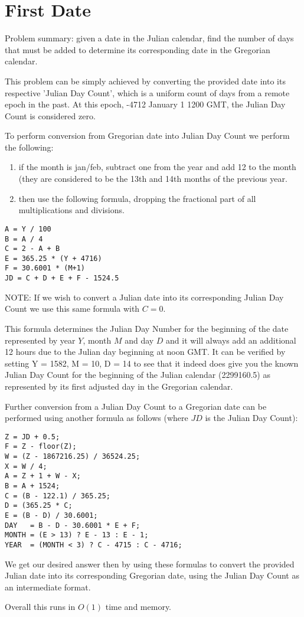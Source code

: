 \section{First Date}

Problem summary: given a date in the Julian calendar, find the number of days that must
be added to determine its corresponding date in the Gregorian calendar.

This problem can be simply achieved by converting the provided date into its respective
'Julian Day Count', which is a uniform count of days from a remote epoch in the past.
At this epoch, -4712 January 1 1200 GMT, the Julian Day Count is considered zero.

To perform conversion from Gregorian date into Julian Day Count we perform the following:

\begin{enumerate}
\item if the month is jan/feb, subtract one from the year and add 12 to the month (they are 
considered to be the 13th and 14th months of the previous year. \\
\item then use the following formula, dropping the fractional part of all multiplications 
  and divisions. \\
\end{enumerate}

\begin{verbatim}
A = Y / 100
B = A / 4
C = 2 - A + B
E = 365.25 * (Y + 4716)
F = 30.6001 * (M+1)
JD = C + D + E + F - 1524.5
\end{verbatim}

NOTE: If we wish to convert a Julian date into its corresponding Julian Day Count we
use this same formula with $C=0$.

This formula determines the Julian Day Number for the beginning of the date represented by
year $Y$, month $M$ and day $D$ and it will always add an additional 12 hours due to the
Julian day beginning at noon GMT. It can be verified by setting Y = 1582, M = 10, D = 14 
to see that it indeed does give you the known Julian Day Count for the beginning of the 
Julian calendar (2299160.5) as represented by its first adjusted day in the Gregorian calendar.

Further conversion from a Julian Day Count to a Gregorian date can be performed using another
formula as follows (where $JD$ is the Julian Day Count):

\begin{verbatim}
Z = JD + 0.5;
F = Z - floor(Z);
W = (Z - 1867216.25) / 36524.25;
X = W / 4;
A = Z + 1 + W - X;
B = A + 1524;
C = (B - 122.1) / 365.25;
D = (365.25 * C;
E = (B - D) / 30.6001;
DAY   = B - D - 30.6001 * E + F;
MONTH = (E > 13) ? E - 13 : E - 1;
YEAR  = (MONTH < 3) ? C - 4715 : C - 4716;
\end{verbatim}

We get our desired answer then by using these formulas to convert the provided Julian
date into its corresponding Gregorian date, using the Julian Day Count as an intermediate
format.

Overall this runs in $O(1)$ time and memory.

